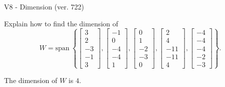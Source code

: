\begin{exercise}
  \begin{exerciseTitle}V8 - Dimension (ver. 722)\end{exerciseTitle}
  \begin{exerciseStatement}
    Explain how to find the dimension of 
\[W=\mathrm{span}\ \left\{\left[\begin{array}{r}
3 \\
2 \\
-3 \\
-1 \\
3
\end{array}\right] , \left[\begin{array}{r}
-1 \\
0 \\
-4 \\
-4 \\
1
\end{array}\right] , \left[\begin{array}{r}
0 \\
1 \\
-2 \\
-3 \\
0
\end{array}\right] , \left[\begin{array}{r}
2 \\
4 \\
-11 \\
-11 \\
4
\end{array}\right] , \left[\begin{array}{r}
-4 \\
-4 \\
-4 \\
-2 \\
-3
\end{array}\right]\right\}.\]



  \end{exerciseStatement}
  \begin{exerciseAnswer}
   The dimension of \(W\) is  \(4\).
  


  \end{exerciseAnswer}
\end{exercise}